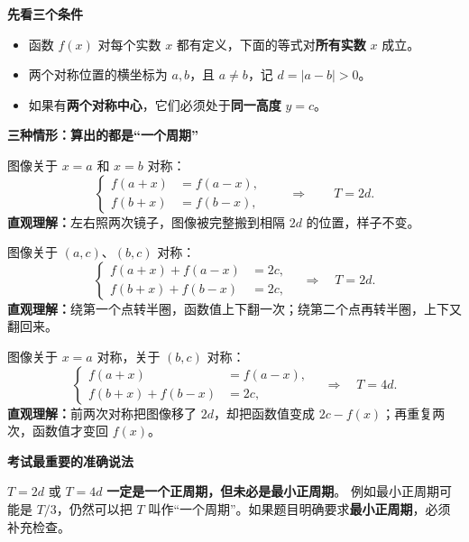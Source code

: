 \begin{statementbox}


\textbf{\textcolor{CStatement}{先看三个条件}}
\begin{itemize}[leftmargin=*,itemsep=0.25em]
  \item 函数 $f(x)$ 对每个实数 $x$ 都有定义，下面的等式对\textbf{所有实数} $x$ 成立。
  \item 两个对称位置的横坐标为 $a,b$，且 $a\neq b$，记 $d=|a-b|>0$。
  \item 如果有\textbf{两个对称中心}，它们必须处于\textbf{同一高度} $y=c$。
\end{itemize}

\medskip
\textbf{\textcolor{CStatement}{三种情形：算出的都是“一个周期”}}
\end{statementbox}\clearpage\begin{statementbox}\begin{description}[style=nextline,leftmargin=2.4em,itemsep=0.7em]
\item[\textbf{情形一：两条对称轴（轴轴）}] 图像关于 $x=a$ 和 $x=b$ 对称：
\[
\left\{\begin{aligned}f(a+x)&=f(a-x),\\f(b+x)&=f(b-x),\end{aligned}\right.
\qquad \Longrightarrow\qquad \boxed{T=2d}.
\]
\textbf{直观理解：}左右照两次镜子，图像被完整搬到相隔 $2d$ 的位置，样子不变。
\item[\textbf{情形二：两个同高度的对称中心（点点）}] 图像关于 $(a,c)$、$(b,c)$ 对称：
\[
\left\{\begin{aligned}
 f(a+x)+f(a-x)&=2c,\\
 f(b+x)+f(b-x)&=2c,
\end{aligned}\right.
\quad\Longrightarrow\quad \boxed{T=2d}.
\]
\textbf{直观理解：}绕第一个点转半圈，函数值上下翻一次；绕第二个点再转半圈，上下又翻回来。
\item[\textbf{情形三：一条对称轴和一个对称中心（轴点）}] 图像关于 $x=a$ 对称，关于 $(b,c)$ 对称：
\[
\left\{\begin{aligned}
 f(a+x)&=f(a-x),\\
 f(b+x)+f(b-x)&=2c,
\end{aligned}\right.
\quad\Longrightarrow\quad \boxed{T=4d}.
\]
\textbf{直观理解：}前两次对称把图像移了 $2d$，却把函数值变成 $2c-f(x)$；再重复两次，函数值才变回 $f(x)$。
\end{description}

\medskip
\textbf{\textcolor{CStatement}{考试最重要的准确说法}}

$T=2d$ 或 $T=4d$ \textbf{一定是一个正周期，但未必是最小正周期}。
例如最小正周期可能是 $T/3$，仍然可以把 $T$ 叫作“一个周期”。如果题目明确要求\textbf{最小正周期}，必须补充检查。
\end{statementbox}
